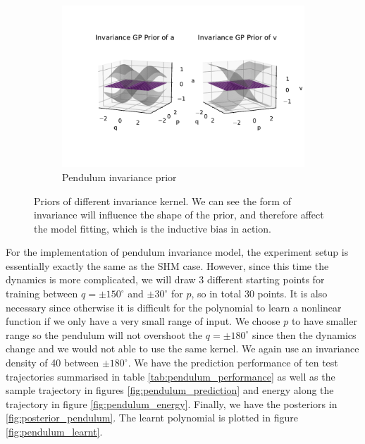\documentclass{statsmsc}
\begin{document}
\begin{figure}[H]
\begin{subfigure}[b]{0.6\linewidth}
         \includegraphics[width=\linewidth]{../codes/figures/prior_pendulum_invariance.pdf}
         \caption{Pendulum invariance prior}
         \label{fig:prior_pendulum_invariance}
     \end{subfigure}
        \caption{Priors of different invariance kernel. We can see the form of invariance will influence the shape of the prior, and therefore affect the model fitting, which is the inductive bias in action.}
        \label{fig:priors}
\end{figure}

For the implementation of pendulum invariance model, the experiment setup is essentially exactly the same as the SHM case. 
However, since this time the dynamics is more complicated, we will draw 3 different starting points for training between $q=\pm 150^{\circ}$ and $\pm 30^{\circ}$ for $p$, so in total 30 points.
It is also necessary since otherwise it is difficult for the polynomial to learn a nonlinear function if we only have a very small range of input.
We choose $p$ to have smaller range so the pendulum will not overshoot the $q=\pm 180^\circ$ since then the dynamics change and we would not able to use the same kernel.
We again use an invariance density of 40 between $\pm 180^{\circ}$.
We have the prediction performance of ten test trajectories summarised in table \ref{tab:pendulum_performance} as well as the sample trajectory in figures \ref{fig:pendulum_prediction} and energy along the trajectory in figure \ref{fig:pendulum_energy}.
Finally, we have the posteriors in \ref{fig:posterior_pendulum}.
The learnt polynomial is plotted in figure \ref{fig:pendulum_learnt}.
\end{document}
